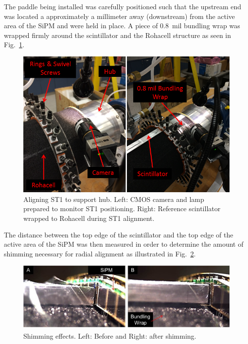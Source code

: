 The paddle being installed was carefully positioned such that the upstream end was located a approximately a millimeter away (downstream) from the active area of the SiPM and were held in place. A piece of 0.8~mil bundling wrap was wrapped firmly around the scintillator and the Rohacell structure as seen in Fig.~\ref{fig:aligning_st1_to_hub}. 
	\begin{figure}[!htb]
		\centering
		\includegraphics[width=1.0\columnwidth]{fabrication/figs/aligning_st1_to_hub}
		\caption{Aligning ST1 to support hub.  Left: CMOS camera and lamp prepared to monitor ST1 positioning.  Right: Reference scintillator wrapped to Rohacell during ST1 alignment.}
		\label{fig:aligning_st1_to_hub}
	\end{figure}
The distance between the top edge of the scintillator and the top edge of the active area of the SiPM was then measured in order to determine the amount of shimming necessary for radial alignment as illustrated in Fig.~\ref{fig:shimming_effects}. 
	\begin{figure}[!htb]
		\centering
		\includegraphics[width=1.0\columnwidth]{fabrication/figs/st_va}
		\caption[Shimming effects]{Shimming effects.  Left: Before and Right: after shimming.}
		\label{fig:shimming_effects}
	\end{figure}

